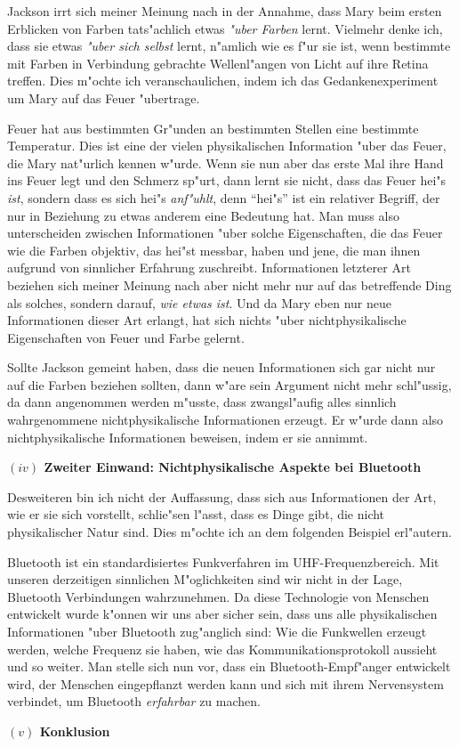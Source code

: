 \documentclass[a4paper, emulatestandardclasses, 12pt]{scrartcl}
\begin{document}
\begin{onehalfspace}
\noindent Jackson irrt sich meiner Meinung nach in der Annahme, dass Mary beim ersten Erblicken von Farben tats"achlich etwas \emph{"uber Farben} lernt. Vielmehr denke ich, dass sie etwas \emph{"uber sich selbst} lernt, n"amlich wie es f"ur sie ist, wenn bestimmte mit Farben in Verbindung gebrachte Wellenl"angen von Licht auf ihre Retina treffen. Dies m"ochte ich veranschaulichen, indem ich das Gedankenexperiment um Mary auf das Feuer "ubertrage. 

Feuer hat aus bestimmten Gr"unden an bestimmten Stellen eine bestimmte Temperatur. Dies ist eine der vielen physikalischen Information "uber das Feuer, die Mary nat"urlich kennen w"urde. Wenn sie nun aber das erste Mal ihre Hand ins Feuer legt und den Schmerz sp"urt, dann lernt sie nicht, dass das Feuer hei"s \emph{ist}, sondern dass es sich hei"s \emph{anf"uhlt}, denn "`hei"s"' ist ein relativer Begriff, der nur in Beziehung zu etwas anderem eine Bedeutung hat. Man muss also unterscheiden zwischen Informationen "uber solche Eigenschaften, die das Feuer wie die Farben objektiv, das hei"st messbar, haben und jene, die man ihnen aufgrund von sinnlicher Erfahrung zuschreibt. Informationen letzterer Art beziehen sich meiner Meinung nach aber nicht mehr nur auf das betreffende Ding als solches, sondern darauf, \emph{wie etwas ist}. Und da Mary eben nur neue Informationen dieser Art erlangt, hat sich nichts "uber nichtphysikalische Eigenschaften von Feuer und Farbe gelernt. 

Sollte Jackson gemeint haben, dass die neuen Informationen sich gar nicht nur auf die Farben beziehen sollten, dann w"are sein Argument nicht mehr schl"ussig, da dann angenommen werden m"usste, dass zwangsl"aufig alles sinnlich wahrgenommene nichtphysikalische Informationen erzeugt. Er w"urde dann also nichtphysikalische Informationen beweisen, indem er sie annimmt.

\vspace{5mm}
\noindent\textbf{$(iv)$ Zweiter Einwand: Nichtphysikalische Aspekte bei Bluetooth}

\noindent Desweiteren bin ich nicht der Auffassung, dass sich aus Informationen der Art, wie er sie sich vorstellt, schlie"sen l"asst, dass es Dinge gibt, die nicht physikalischer Natur sind. Dies m"ochte ich an dem folgenden Beispiel erl"autern.

Bluetooth ist ein standardisiertes Funkverfahren im UHF-Frequenzbereich. Mit unseren derzeitigen sinnlichen M"oglichkeiten sind wir nicht in der Lage, Bluetooth Verbindungen wahrzunehmen. Da diese Technologie von Menschen entwickelt wurde k"onnen wir uns aber sicher sein, dass uns alle physikalischen Informationen "uber Bluetooth zug"anglich sind: Wie die Funkwellen erzeugt werden, welche Frequenz sie haben, wie das Kommunikationsprotokoll aussieht und so weiter. Man stelle sich nun vor, dass ein Bluetooth-Empf"anger entwickelt wird, der Menschen eingepflanzt werden kann und sich mit ihrem Nervensystem verbindet, um Bluetooth \emph{erfahrbar} zu machen. 

\vspace{5mm}
\noindent\textbf{$(v)$ Konklusion}

\noindent 




\end{onehalfspace}

\end{document}
